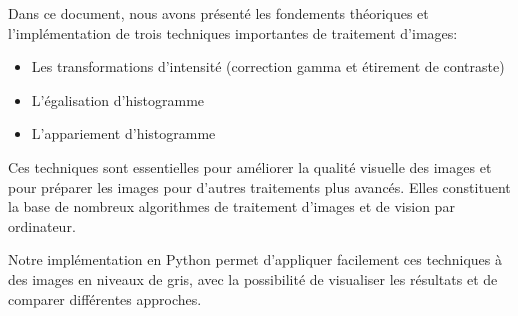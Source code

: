 \documentclass[12pt,a4paper]{article}
\begin{document}
Dans ce document, nous avons présenté les fondements théoriques et l'implémentation de trois techniques importantes de traitement d'images:
\begin{itemize}
    \item Les transformations d'intensité (correction gamma et étirement de contraste)
    \item L'égalisation d'histogramme
    \item L'appariement d'histogramme
\end{itemize}

Ces techniques sont essentielles pour améliorer la qualité visuelle des images et pour préparer les images pour d'autres traitements plus avancés. Elles constituent la base de nombreux algorithmes de traitement d'images et de vision par ordinateur.

Notre implémentation en Python permet d'appliquer facilement ces techniques à des images en niveaux de gris, avec la possibilité de visualiser les résultats et de comparer différentes approches.
\end{document}
